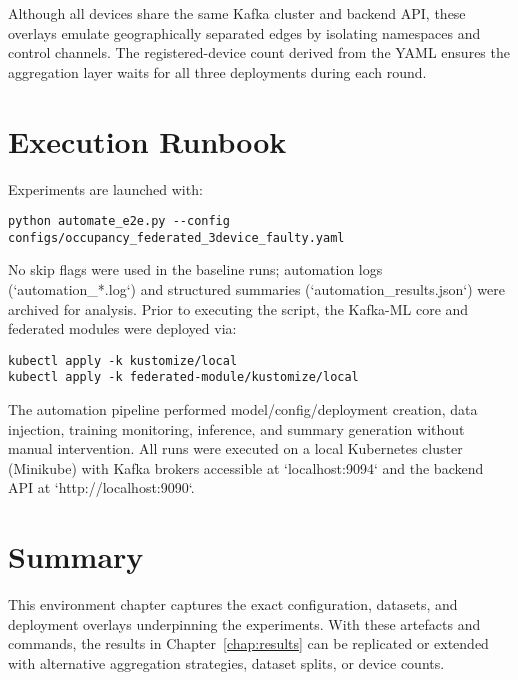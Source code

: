 Although all devices share the same Kafka cluster and backend API, these overlays emulate geographically separated edges by isolating namespaces and control channels. The registered-device count derived from the YAML ensures the aggregation layer waits for all three deployments during each round.

\section{Execution Runbook}
\label{sec:execution_runbook}

Experiments are launched with:

\begin{verbatim}
python automate_e2e.py --config configs/occupancy_federated_3device_faulty.yaml
\end{verbatim}

No skip flags were used in the baseline runs; automation logs (`automation_*.log`) and structured summaries (`automation_results.json`) were archived for analysis. Prior to executing the script, the Kafka-ML core and federated modules were deployed via:

\begin{verbatim}
kubectl apply -k kustomize/local
kubectl apply -k federated-module/kustomize/local
\end{verbatim}

The automation pipeline performed model/config/deployment creation, data injection, training monitoring, inference, and summary generation without manual intervention. All runs were executed on a local Kubernetes cluster (Minikube) with Kafka brokers accessible at `localhost:9094` and the backend API at `http://localhost:9090`.

\section{Summary}

This environment chapter captures the exact configuration, datasets, and deployment overlays underpinning the experiments. With these artefacts and commands, the results in Chapter~\ref{chap:results} can be replicated or extended with alternative aggregation strategies, dataset splits, or device counts.

